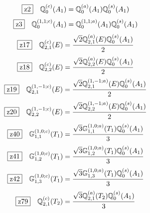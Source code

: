 \documentclass[fleqn,10pt,landscape]{jsarticle}
\begin{document}
\begin{dmath*}
\hspace*{3mm}\fbox{z2}\quad \mathbb{Q}_{0}^{(c)}(A_{1})=\mathbb{Q}_{0}^{(a)}(A_{1}) \mathbb{Q}_{0}^{(s)}(A_{1})
\end{dmath*}
\begin{dmath*}
\hspace*{3mm}\fbox{z3}\quad \mathbb{Q}_{0}^{(1,1;c)}(A_{1})=\mathbb{Q}_{0}^{(1,1;a)}(A_{1}) \mathbb{Q}_{0}^{(s)}(A_{1})
\end{dmath*}
\begin{dmath*}
\hspace*{3mm}\fbox{z17}\quad \mathbb{Q}_{2,1}^{(c)}(E)=\frac{\sqrt{2} \mathbb{Q}_{2,1}^{(a)}(E) \mathbb{Q}_{0}^{(s)}(A_{1})}{2}
\end{dmath*}
\begin{dmath*}
\hspace*{3mm}\fbox{z18}\quad \mathbb{Q}_{2,2}^{(c)}(E)=\frac{\sqrt{2} \mathbb{Q}_{2,2}^{(a)}(E) \mathbb{Q}_{0}^{(s)}(A_{1})}{2}
\end{dmath*}
\begin{dmath*}
\hspace*{3mm}\fbox{z19}\quad \mathbb{Q}_{2,1}^{(1,-1;c)}(E)=\frac{\sqrt{2} \mathbb{Q}_{2,1}^{(1,-1;a)}(E) \mathbb{Q}_{0}^{(s)}(A_{1})}{2}
\end{dmath*}
\begin{dmath*}
\hspace*{3mm}\fbox{z20}\quad \mathbb{Q}_{2,2}^{(1,-1;c)}(E)=\frac{\sqrt{2} \mathbb{Q}_{2,2}^{(1,-1;a)}(E) \mathbb{Q}_{0}^{(s)}(A_{1})}{2}
\end{dmath*}
\begin{dmath*}
\hspace*{3mm}\fbox{z40}\quad \mathbb{G}_{1,1}^{(1,0;c)}(T_{1})=\frac{\sqrt{3} \mathbb{G}_{1,1}^{(1,0;a)}(T_{1}) \mathbb{Q}_{0}^{(s)}(A_{1})}{3}
\end{dmath*}
\begin{dmath*}
\hspace*{3mm}\fbox{z41}\quad \mathbb{G}_{1,2}^{(1,0;c)}(T_{1})=\frac{\sqrt{3} \mathbb{G}_{1,2}^{(1,0;a)}(T_{1}) \mathbb{Q}_{0}^{(s)}(A_{1})}{3}
\end{dmath*}
\begin{dmath*}
\hspace*{3mm}\fbox{z42}\quad \mathbb{G}_{1,3}^{(1,0;c)}(T_{1})=\frac{\sqrt{3} \mathbb{G}_{1,3}^{(1,0;a)}(T_{1}) \mathbb{Q}_{0}^{(s)}(A_{1})}{3}
\end{dmath*}
\begin{dmath*}
\hspace*{3mm}\fbox{z79}\quad \mathbb{Q}_{2,1}^{(c)}(T_{2})=\frac{\sqrt{3} \mathbb{Q}_{2,1}^{(a)}(T_{2}) \mathbb{Q}_{0}^{(s)}(A_{1})}{3}
\end{dmath*}
\end{document}
